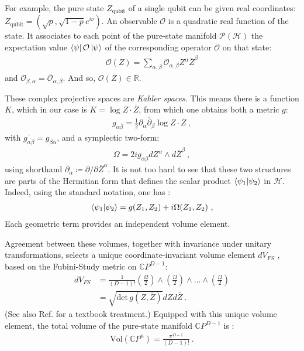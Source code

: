\documentclass[draft,nofootinbib,pre,twocolumn,showpacs,showkeys,groupaddress,preprintnumbers,floatfix]{revtex4-1}
\newcommand{\1}{\mathbbm{1}}
\begin{document}
For example, the pure state $Z_{\mathrm{qubit}}$ of a single qubit can be given
real coordinates: $Z_{\mathrm{qubit}} = (\sqrt{p},\sqrt{1-p} e^{i\nu})$. An
observable $\mathcal{O}$ is a quadratic real function of the state. It
associates to each point of the pure-state manifold $\mathcal{P}\left(
\mathcal{H} \right)$ the expectation value $\bra{\psi} \mathcal{O} \ket{\psi}$
of the corresponding operator $\mathcal{O}$ on that state:
\begin{align}
\mathcal{O}(Z) = \sum_{\alpha,\beta} \mathcal{O}_{\alpha,\beta}Z^\alpha \overline{Z}^\beta
\label{eq:GQM_Observable}
\end{align}
and $\mathcal{O}_{\beta,\alpha} = \overline{\mathcal{O}}_{\alpha,\beta}$. And
so, $\mathcal{O}(Z) \in \mathbb{R}$.

These complex projective spaces are \emph{Kahler spaces}. This means there
is a function $K$, which in our case is $K = \log Z \cdot \overline{Z}$,
from which one obtains both a metric $g$:
\begin{align*}
g_{\alpha \overline{\beta}} = \frac{1}{2} \partial_\alpha \overline{\partial}_{\beta} \log Z \cdot \overline{Z}
  ~,
\end{align*}
with $\overline{g_{\alpha \beta} } = g_{\beta \alpha}$, and a symplectic
two-form:
\begin{align*}
\Omega = 2ig_{\alpha \beta} dZ^\alpha \wedge d\overline{Z}^\beta
  ~,
\end{align*}
using shorthand $\overline{\partial}_\alpha \coloneqq \partial/\partial
\overline{Z}^\alpha$. It is not too hard to see that these two structures are
parts of the Hermitian form that defines the scalar product
$\braket{\psi_1}{\psi_2}$ in $\mathcal{H}$. Indeed, using the standard notation,
one has \cite{Gibbons1992}:
\begin{align*}
\braket{\psi_1}{\psi_2} = g(Z_1,Z_2) + i \Omega(Z_1,Z_2)
  ~,
\end{align*}
Each geometric term provides an independent volume element.

Agreement between these volumes, together with invariance under unitary
transformations, selects a unique coordinate-invariant volume element $d
V_{FS}$ \cite{Brody1998}, based on the Fubini-Study metric on
$\mathbb{C}P^{D-1}$:
\begin{subequations}
\begin{align}
d V_{FS}
  & = \frac{1}{(D-1)!} \left( \frac{\Omega}{2}\right)
  \wedge \left( \frac{\Omega}{2}\right)
  \wedge \ldots \wedge
  \left( \frac{\Omega}{2}\right) \\
  & = \sqrt{\mathrm{det}\,g(Z,\overline{Z})} dZ d\overline{Z}
  ~.
\end{align}
\label{eq:FSMeasure}
\end{subequations}
(See also Ref. \cite{Bengtsson2017} for a textbook treatment.) Equipped with this unique volume element, the total volume of the pure-state manifold
$\mathbb{C}P^{D-1}$ is \cite{Bengtsson2017,Gibbons1992}:
\begin{align*}
\mathrm{Vol} \left( \mathbb{C}P^n\right) = \frac{\pi^{D-1}}{(D-1)!}
  ~.
\end{align*}
\end{document}
